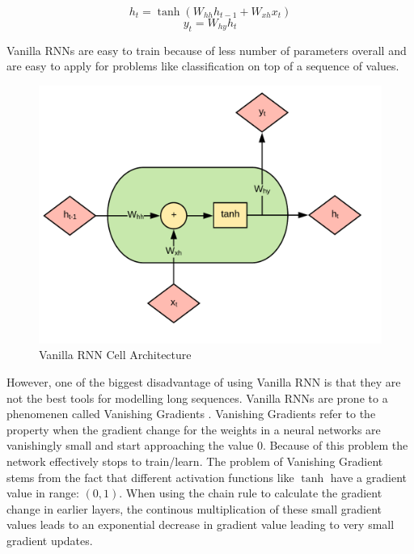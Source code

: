 \documentclass[letterpaper, 12 pt, conference]{ieeeconf}  %
\begin{document}
\begin{equation}
h_{t} = \tanh(W_{hh}h_{t-1} + W_{xh}x_t)
\end{equation}
\begin{equation}
y_{t} = W_{hy}h_{t}
\end{equation}

Vanilla RNNs are easy to train because of less number of parameters overall and are easy to apply for problems like classification on top of a sequence of values. 

\begin{figure}[!h]
\centering
\includegraphics[scale=0.20]{../figs/vrnn/diagram.png}	
\caption{Vanilla RNN Cell Architecture}
\label{fig:Vanilla_RNN_Arch} 
\end{figure}

However, one of the biggest disadvantage of using Vanilla RNN is that they are not the best tools for modelling long sequences. Vanilla RNNs are prone to a phenomenen called Vanishing Gradients \cite{vanishing_gradient} \cite{lstm_intro}. Vanishing Gradients refer to the property when the gradient change for the weights in a neural networks are vanishingly small and start approaching the value $0$. Because of this problem the network effectively stops to train/learn. The problem of Vanishing Gradient stems from the fact that different activation functions like $\tanh$ have a gradient value in range: $(0, 1)$. When using the chain rule to calculate the gradient change in earlier layers, the continous multiplication of these small gradient values leads to an exponential decrease in gradient value leading to very small gradient updates.
\end{document}
